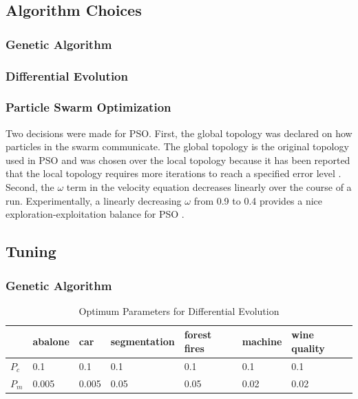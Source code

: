 \documentclass[twoside,11pt]{article}
\begin{document}
\subsection{Algorithm Choices}

\subsubsection{Genetic Algorithm}

\subsubsection{Differential Evolution}

\subsubsection{Particle Swarm Optimization}

	
	Two decisions were made for PSO. First, the global topology was declared on how particles in the swarm communicate. 
	The global topology is the original topology used in PSO and was chosen over the local topology because it has been reported that the local topology requires more iterations to reach a specified error level \citep{og-pso}. 
	Second, the $\omega$ term in the velocity equation decreases linearly over the course of a run. Experimentally, a linearly decreasing $\omega$ from 0.9 to 0.4 provides a nice exploration-exploitation balance for PSO \citep{inertia}.

\subsection{Tuning}

\subsubsection{Genetic Algorithm}

	\begin{table}[h]
		\centering
		\begin{tabular}{|l|l|l|l|l|l|l|}
			\hline
			       & abalone & car & segmentation & forest fires & machine & wine quality  \\ \hline
			$P_c$  &     0.1 & 0.1 &          0.1 &          0.1 &     0.1 &          0.1  \\ \hline
			$P_m$  &   0.005 & 0.005 &       0.05 &         0.05 &    0.02 &         0.02  \\ \hline
		\end{tabular}
		\caption{Optimum Parameters for Differential Evolution}
		\label{ga-tuning-table}
	\end{table}
\end{document}
